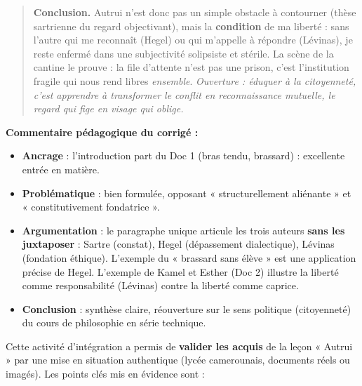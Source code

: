 \documentclass[11pt]{article}
\newcounter{popsec}
\newcounter{popsub}
\newcommand{\courssub}[1]{%
  \stepcounter{popsub}%
  \par\vspace{9pt}\noindent{\popxbold\fontsize{11.5}{13}\selectfont\color{popink}{\color{poporange}\thepopsec.\thepopsub}\hspace{6pt}#1}\par\nopagebreak\vspace{4pt}
}
\begin{document}
\begin{exoresolu}
\begin{quote}
\textbf{Conclusion.} Autrui n'est donc pas un simple obstacle à contourner (thèse sartrienne du regard objectivant), mais la \textbf{condition} de ma liberté : sans l'autre qui me reconnaît (Hegel) ou qui m'appelle à répondre (Lévinas), je reste enfermé dans une subjectivité solipsiste et stérile. La scène de la cantine le prouve : la file d'attente n'est pas une prison, c'est l'institution fragile qui nous rend libres \emph{ensemble}. \emph{Ouverture : éduquer à la citoyenneté, c'est apprendre à transformer le conflit en reconnaissance mutuelle, le regard qui fige en visage qui oblige.}
\end{quote}
\tcblower
\textbf{Commentaire pédagogique du corrigé :}
\begin{itemize}
    \item \textbf{Ancrage} : l'introduction part du Doc 1 (bras tendu, brassard) : excellente entrée en matière.
    \item \textbf{Problématique} : bien formulée, opposant « structurellement aliénante » et « constitutivement fondatrice ».
    \item \textbf{Argumentation} : le paragraphe unique articule les trois auteurs \textbf{sans les juxtaposer} : Sartre (constat), Hegel (dépassement dialectique), Lévinas (fondation éthique). L'exemple du « brassard sans élève » est une application précise de Hegel. L'exemple de Kamel et Esther (Doc 2) illustre la liberté comme responsabilité (Lévinas) contre la liberté comme caprice.
    \item \textbf{Conclusion} : synthèse claire, réouverture sur le sens politique (citoyenneté) du cours de philosophie en série technique.
\end{itemize}
\end{exoresolu}

\courssub{Bilan de l'activité}
Cette activité d'intégration a permis de \textbf{valider les acquis} de la leçon « Autrui » par une mise en situation authentique (lycée camerounais, documents réels ou imagés). Les points clés mis en évidence sont :
\end{document}
